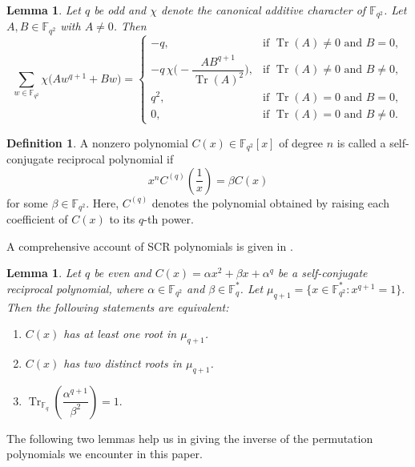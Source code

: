 \documentclass[12pt]{amsart}
\newtheorem{lemma}[theorem]{Lemma}
\theoremstyle{definition}
\newtheorem{definition}{Definition}[section]
\theoremstyle{remark}
\numberwithin{equation}{section}
\begin{document}
\begin{lemma}\cite{r3,r4}\label{l3}
    Let $q$ be odd and $\chi$ denote the canonical additive character of $\mathbb{F}_{q^2}$. Let $A, B \in \mathbb{F}_{q^2}$ with $A \neq 0$. Then
$$
\sum_{w \in \mathbb{F}_{q^2}} \chi\big(A w^{q+1} + B w\big) =
\begin{cases}
-q, & \text{if } \operatorname{Tr}(A) \neq 0 \text{ and } B = 0,\\[1mm]
-q \, \chi\Big( -\dfrac{A B^{q+1}}{\operatorname{Tr}(A)^2} \Big), & \text{if } \operatorname{Tr}(A) \neq 0 \text{ and } B \neq 0,\\[1mm]
q^2, & \text{if } \operatorname{Tr}(A) = 0 \text{ and } B = 0,\\[1mm]
0, & \text{if } \operatorname{Tr}(A) = 0 \text{ and } B \neq 0.
\end{cases}
$$
\end{lemma}

\begin{definition}
    A nonzero polynomial $C(x) \in \mathbb{F}_{q^2}[x]$ of degree $n$ is called a self-conjugate reciprocal polynomial if
$$
x^n C^{(q)}\!\left(\frac{1}{x}\right) = \beta C(x)
$$
for some $\beta \in \mathbb{F}_{q^2}$. Here, $C^{(q)}$ denotes the polynomial obtained by raising each coefficient of $C(x)$ to its $q$-th power.
\end{definition}
A comprehensive account of SCR polynomials is given in \cite{pp3}.
\begin{lemma}\cite{r5}\label{l4}
    Let $q$ be even and $C(x) = \alpha x^2 + \beta x + \alpha^q$ 
be a self-conjugate reciprocal polynomial, where $\alpha \in \mathbb{F}_{q^2}$ and $\beta \in \mathbb{F}_q^*$. Let $\mu_{q+1}=\{x \in \mathbb{F}_{q^2}^* : x^{q+1}=1\}.
$ Then the following statements are equivalent:  

\begin{enumerate}
    \item $C(x)$ has at least one root in $\mu_{q+1}$.
    \item $C(x)$ has two distinct roots in $\mu_{q+1}$.
    \item $\operatorname{Tr}_{\mathbb{F}_{q}}\!\left(\dfrac{\alpha^{q+1}}{\beta^2}\right)=1.
$
\end{enumerate}
\end{lemma}
The following two lemmas help us in giving the inverse of the permutation polynomials we encounter in this paper.
\end{document}

